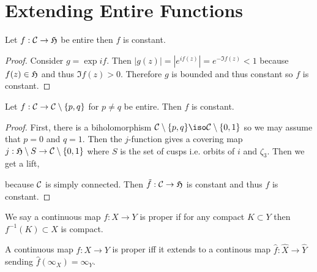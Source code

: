 \documentclass[12pt]{article}
\begin{document}
\section{Extending Entire Functions}

\begin{lemma}
Let $f : \mathcal{C} \to \mathfrak{H}$ be entire then $f$ is constant.
\end{lemma}

\begin{proof}
Consider $g = \exp{if}$. Then $|g(z)| = |e^{if(z)}| = e^{- \Im{f(z)}} < 1$ because $f(z) \in \mathfrak{H}$ and thus $\Im{f(z)} > 0$. Therefore $g$ is bounded and thus constant so $f$ is constant.
\end{proof}

\begin{theorem}
Let $f : \mathcal{C} \to \mathcal{C} \setminus \{ p, q \}$ for $p \neq q$ be entire. Then $f$ is constant.
\end{theorem} 

\begin{proof}
First, there is a biholomorphism $\C \setminus \{ p, q \} \iso \C \setminus \{0, 1 \}$ so we may assume that $p = 0$ and $q = 1$. Then the $j$-function gives a covering map $j : \mathfrak{H} \setminus S \to \mathcal{C} \setminus \{0, 1\}$ where $S$ is the set of cusps i.e. orbits of $i$ and $\zeta_3$. Then we get a lift,
\begin{center}
\end{center}
because $\mathcal{C}$ is simply connected. Then $\tilde{f} : \mathcal{C} \to \mathfrak{H}$ is constant and thus $f$ is constant.
\end{proof}

\begin{defn}
We say a continuous map $f : X \to Y$ is proper if for any compact $K \subset Y$ then $f^{-1}(K) \subset X$ is compact.
\end{defn}

\begin{lemma}
A continuous map $f : X \to Y$ is proper iff it extends to a continous map $\hat{f} : \hat{X} \to \hat{Y}$ sending $\hat{f}(\infty_X) = \infty_Y$.
\end{lemma}
\end{document}
